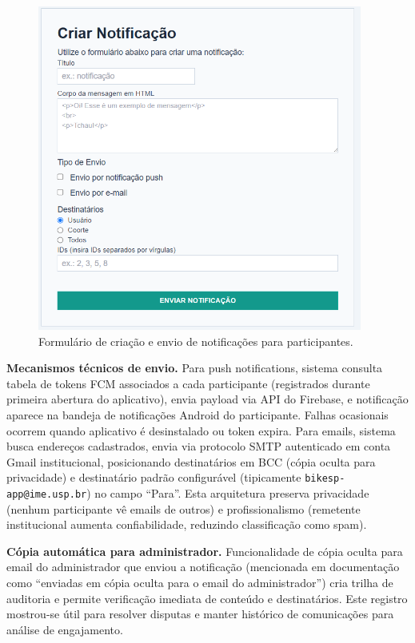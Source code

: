  \begin{figure}[H]
   \centering
   \includegraphics[width=0.95\textwidth]{figuras/notificacao_criar.PNG}
   \caption{Formulário de criação e envio de notificações para participantes.}
   \label{fig:notificacao_criar}
 \end{figure}

\textbf{Mecanismos técnicos de envio.} Para push notifications, sistema consulta tabela de tokens FCM associados a cada participante (registrados durante primeira abertura do aplicativo), envia payload via API do Firebase, e notificação aparece na bandeja de notificações Android do participante. Falhas ocasionais ocorrem quando aplicativo é desinstalado ou token expira. Para emails, sistema busca endereços cadastrados, envia via protocolo SMTP autenticado em conta Gmail institucional, posicionando destinatários em BCC (cópia oculta para privacidade) e destinatário padrão configurável (tipicamente \texttt{bikesp-app@ime.usp.br}) no campo ``Para''. Esta arquitetura preserva privacidade (nenhum participante vê emails de outros) e profissionalismo (remetente institucional aumenta confiabilidade, reduzindo classificação como spam).

\textbf{Cópia automática para administrador.} Funcionalidade de cópia oculta para email do administrador que enviou a notificação (mencionada em documentação como ``enviadas em cópia oculta para o email do administrador'') cria trilha de auditoria e permite verificação imediata de conteúdo e destinatários. Este registro mostrou-se útil para resolver disputas e manter histórico de comunicações para análise de engajamento.


